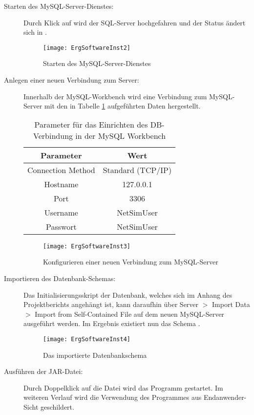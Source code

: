 \begin{description}
\item [Starten des MySQL-Server-Dienstes:]
Durch Klick auf  wird der SQL-Server hochgefahren und der Status ändert sich in .
\begin{figure}[ht]
	\centering
	\texttt{[image: ErgSoftwareInst2]}
	\caption{Starten des MySQL-Server-Dienstes}
	\label{fig:ErgSoftwareInst2}
\end{figure}
\item [Anlegen einer neuen Verbindung zum Server:]
Innerhalb der MySQL-Workbench wird eine Verbindung zum MySQL-Server mit den in Tabelle \ref{tab:mysql} aufgeführten Daten hergestellt.
\begin{table}[ht]
\centering
\caption{Parameter für das Einrichten des DB-Verbindung in der MySQL Workbench}
\label{tab:mysql}
	 \begin{tabular}{cc}
	\textbf{Parameter} & \textbf{Wert}\\
	\hline
	\hline
	Connection Method & Standard (TCP/IP)\\
	 \hline
	Hostname & 127.0.0.1\\
	 \hline
	Port & 3306\\
	 \hline
	Username & NetSimUser\\
	 \hline
	Passwort & NetSimUser\\
	 \end{tabular}
\end{table}
\begin{figure}[ht]
	\centering
	\texttt{[image: ErgSoftwareInst3]}
	\caption{Konfigurieren einer neuen Verbindung zum MySQL-Server}
	\label{fig:ErgSoftwareInst3}
\end{figure}
\item [Importieren des Datenbank-Schemas:] Das Initialisierungsskript der Datenbank, welches sich im Anhang des Projektberichts angehängt ist, kann daraufhin über Server $ > $ Import Data $ > $ Import from Self-Contained File auf dem neuen MySQL-Server ausgeführt werden. Im Ergebnis existiert nun das Schema .
\begin{figure}[ht]
	\centering
	\texttt{[image: ErgSoftwareInst4]}
	\caption{Das importierte Datenbankschema }
	\label{fig:ErgSoftwareInst4}
\end{figure}
\item [Ausführen der JAR-Datei:] Durch Doppelklick auf die Datei  wird das Programm gestartet. Im weiteren Verlauf wird die Verwendung des Programmes aus Endanwender-Sicht geschildert.
\end{description}

